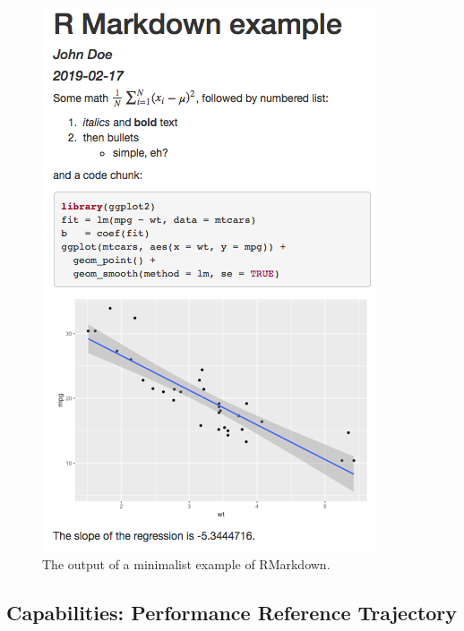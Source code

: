 \documentclass[conference,final,a4paper,]{IEEEtran}
\begin{document}
\begin{figure}[htb]

{\centering \includegraphics[width=1\linewidth]{figures/rmd-example} 

}

\caption{The output of a minimalist example of RMarkdown.}\label{fig:rmd-example}
\end{figure}

\hypertarget{capabilities-performance-reference-trajectory}{%
\subsection{Capabilities: Performance Reference Trajectory}\label{capabilities-performance-reference-trajectory}}
\end{document}
